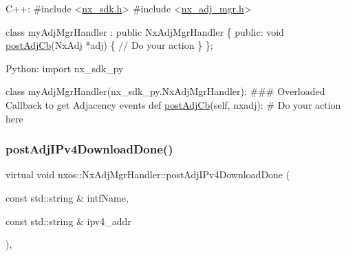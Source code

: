 \begin{DoxyCode}
C++:
\textcolor{preprocessor}{   #include <\mbox{\hyperlink{nx__sdk_8h}{nx\_sdk.h}}>}
\textcolor{preprocessor}{   #include <\mbox{\hyperlink{nx__adj__mgr_8h}{nx\_adj\_mgr.h}}>}

   \textcolor{keyword}{class }myAdjMgrHandler : \textcolor{keyword}{public} NxAdjMgrHandler \{
      \textcolor{keyword}{public}:
         \textcolor{keywordtype}{void} \mbox{\hyperlink{classnxos_1_1_nx_adj_mgr_handler_a9a1f85f218eab71d9c280088f69a14dc}{postAdjCb}}(NxAdj *adj) \{
              \textcolor{comment}{// Do your action}
         \}
   \};

Python:
   \textcolor{keyword}{import} nx\_sdk\_py

   \textcolor{keyword}{class }myAdjMgrHandler(nx\_sdk\_py.NxAdjMgrHandler):
\textcolor{preprocessor}{   ### Overloaded Callback to get Adjacency events}
         def \mbox{\hyperlink{classnxos_1_1_nx_adj_mgr_handler_a9a1f85f218eab71d9c280088f69a14dc}{postAdjCb}}(self, nxadj):
\textcolor{preprocessor}{             # Do your action here}
\end{DoxyCode}
 \mbox{\label{classnxos_1_1_nx_adj_mgr_handler_a84d9b92c976ae528c72e93ab3a75ecd1}} 
\subsubsection{\texorpdfstring{post\+Adj\+I\+Pv4\+Download\+Done()}{postAdjIPv4DownloadDone()}}
{\footnotesize\ttfamily virtual void nxos\+::\+Nx\+Adj\+Mgr\+Handler\+::post\+Adj\+I\+Pv4\+Download\+Done (\begin{DoxyParamCaption}\item[{const std\+::string \&}]{intf\+Name,  }\item[{const std\+::string \&}]{ipv4\+\_\+addr }\end{DoxyParamCaption})\hspace{0.3cm}{\ttfamily [inline]}, {\ttfamily [virtual]}}

